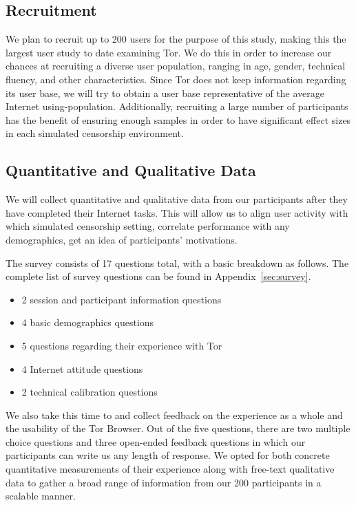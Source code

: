 \documentclass[letterpaper,twocolumn,11pt]{article}
\begin{document}
\subsection{Recruitment}  
\indent \indent We plan to recruit up to 200 users for the purpose of this study, making this the largest user 
study to date examining Tor. We do this in order to increase our chances at recruiting a diverse
user population, ranging in age, gender, technical fluency, and other characteristics. Since Tor 
does not keep information regarding its user base, we will try to obtain a user base representative of
the average Internet using-population. Additionally, recruiting a large number of participants has the 
benefit of ensuring enough samples in order to have significant effect sizes in 
each simulated censorship environment. 

\subsection{Quantitative and Qualitative Data}   
\indent \indent We will collect quantitative and qualitative data from our participants after they have completed 
their Internet tasks. This will allow us to align user activity with which simulated censorship setting, 
correlate performance with any demographics, get an idea of participants' motivations. 

The survey consists of 17 questions total, with a basic breakdown as follows. 
The complete list of survey questions can be found in Appendix~\ref{sec:survey}.

\begin{itemize} \itemsep1pt \parskip0pt 
\item 2 session and participant information questions
\item 4 basic demographics questions
\item 5 questions regarding their experience with Tor
\item 4 Internet attitude questions
\item 2 technical calibration questions
\end{itemize}

We also take this time to and collect feedback on the experience as a whole and the usability of 
the Tor Browser. Out of the five questions, there are two multiple choice questions and three 
open-ended feedback questions in which our participants can write us any length of response. 
We opted for both concrete quantitative measurements of their experience along with free-text
qualitative data to gather a broad range of information from our 200 participants in a scalable manner. 
\end{document}
